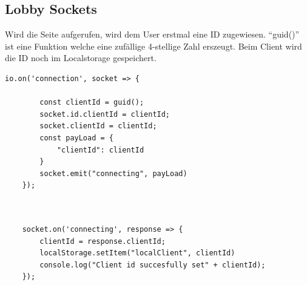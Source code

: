 \subsection{Lobby Sockets}\label{SocketLobby}
Wird die Seite aufgerufen, wird dem User erstmal eine ID zugewiesen. ``guid()'' ist eine Funktion welche eine zufällige 4-stellige Zahl erszeugt.
Beim Client wird die ID noch im Localstorage gespeichert.
\begin{lstlisting}[language=html,caption=Socket Connection Server]
        io.on('connection', socket => {

        const clientId = guid();
        socket.id.clientId = clientId;
        socket.clientId = clientId;
        const payLoad = {
            "clientId": clientId
        }
        socket.emit("connecting", payLoad)
    });
 
\end{lstlisting}

\begin{lstlisting}[language=html,caption=Socket Connection Client]
    
    socket.on('connecting', response => {
        clientId = response.clientId;
        localStorage.setItem("localClient", clientId)
        console.log("Client id succesfully set" + clientId);
    });

\end{lstlisting}

